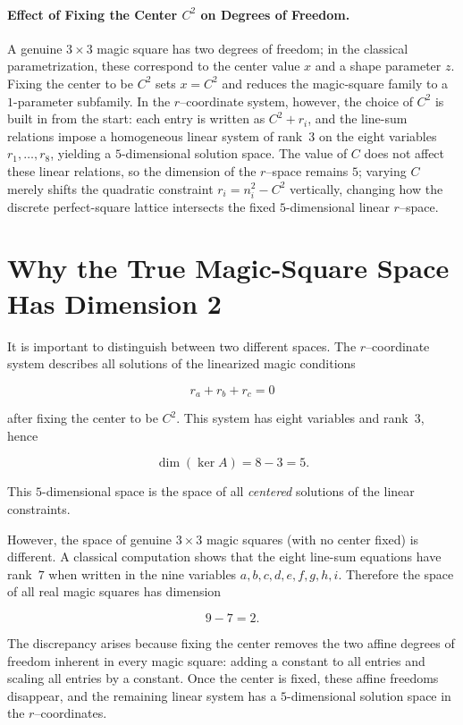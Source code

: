 \documentclass[12pt]{article}
\begin{document}
\paragraph{Effect of Fixing the Center $C^2$ on Degrees of Freedom.}
A genuine $3\times 3$ magic square has two degrees of freedom; in the classical
parametrization, these correspond to the center value $x$ and a shape parameter
$z$.  Fixing the center to be $C^2$ sets $x=C^2$ and reduces the magic-square
family to a $1$-parameter subfamily.  In the $r$--coordinate system, however,
the choice of $C^2$ is built in from the start: each entry is written as
$C^2+r_i$, and the line-sum relations impose a homogeneous linear system of
rank~$3$ on the eight variables $r_1,\dots,r_8$, yielding a $5$-dimensional
solution space.  The value of $C$ does not affect these linear relations, so
the dimension of the $r$--space remains $5$; varying $C$ merely shifts the
quadratic constraint $r_i = n_i^2 - C^2$ vertically, changing how the discrete
perfect-square lattice intersects the fixed $5$-dimensional linear $r$--space.


\section*{Why the True Magic-Square Space Has Dimension 2}

It is important to distinguish between two different spaces.  The
$r$--coordinate system describes all solutions of the linearized magic
conditions


\[
r_a + r_b + r_c = 0
\]


after fixing the center to be $C^2$.  This system has eight variables and
rank~$3$, hence


\[
\dim(\ker A)=8-3=5.
\]


This $5$-dimensional space is the space of all \emph{centered} solutions of
the linear constraints.

However, the space of genuine $3\times 3$ magic squares (with no center
fixed) is different.  A classical computation shows that the eight line-sum
equations have rank~$7$ when written in the nine variables
$a,b,c,d,e,f,g,h,i$.  Therefore the space of all real magic squares has
dimension


\[
9-7=2.
\]



The discrepancy arises because fixing the center removes the two affine
degrees of freedom inherent in every magic square: adding a constant to all
entries and scaling all entries by a constant.  Once the center is fixed,
these affine freedoms disappear, and the remaining linear system has a
$5$-dimensional solution space in the $r$--coordinates.
\end{document}
